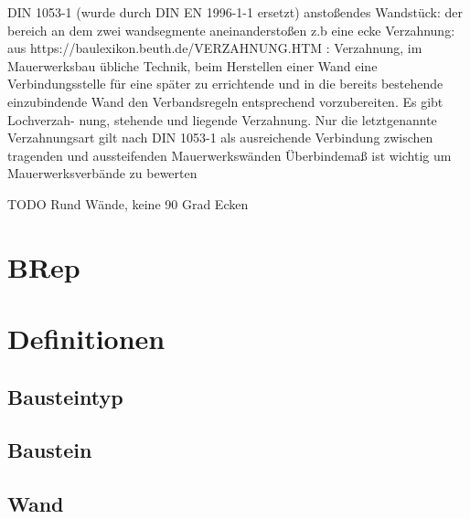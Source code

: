 DIN 1053-1 (wurde durch DIN EN 1996-1-1 ersetzt)
anstoßendes Wandstück: der bereich an dem zwei wandsegmente aneinanderstoßen z.b eine ecke
Verzahnung: aus https://baulexikon.beuth.de/VERZAHNUNG.HTM : Verzahnung, im Mauerwerksbau übliche Technik, beim Herstellen einer Wand eine Verbindungsstelle für eine später zu errichtende und in die bereits bestehende einzubindende Wand den Verbandsregeln entsprechend vorzubereiten. Es gibt Lochverzah- nung, stehende und liegende Verzahnung. Nur die letztgenannte Verzahnungsart gilt nach DIN 1053-1 als ausreichende Verbindung zwischen tragenden und aussteifenden Mauerwerkswänden
Überbindemaß ist wichtig um Mauerwerksverbände zu bewerten

TODO Rund Wände, keine 90 Grad Ecken

\section{BRep}
\label{basics:brep}
\section{Definitionen}
\subsection{Bausteintyp}
\subsection{Baustein}
\subsection{Wand}